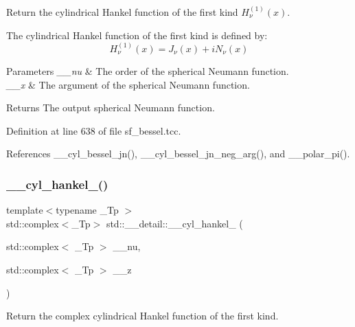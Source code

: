 Return the cylindrical Hankel function of the first kind $ H^{(1)}_\nu(x) $. 

The cylindrical Hankel function of the first kind is defined by\+: \[ H^{(1)}_\nu(x) = J_\nu(x) + i N_\nu(x) \]


\begin{DoxyParams}{Parameters}
{\em \+\_\+\+\_\+nu} & The order of the spherical Neumann function. \\
\hline
{\em \+\_\+\+\_\+x} & The argument of the spherical Neumann function. \\
\hline
\end{DoxyParams}
\begin{DoxyReturn}{Returns}
The output spherical Neumann function. 
\end{DoxyReturn}


Definition at line 638 of file sf\+\_\+bessel.\+tcc.



References \+\_\+\+\_\+cyl\+\_\+bessel\+\_\+jn(), \+\_\+\+\_\+cyl\+\_\+bessel\+\_\+jn\+\_\+neg\+\_\+arg(), and \+\_\+\+\_\+polar\+\_\+pi().

\mbox{\label{namespacestd_1_1____detail_a9904b6007ef78ef777ac8345f6e47960}} 
\subsubsection{\texorpdfstring{\+\_\+\+\_\+cyl\+\_\+hankel\+\_()}{\_\_cyl\_hankel\_1()}\hspace{0.1cm}{\footnotesize\ttfamily [2/2]}}
{\footnotesize\ttfamily template$<$typename \+\_\+\+Tp $>$ \\
std\+::complex$<$\+\_\+\+Tp$>$ std\+::\+\_\+\+\_\+detail\+::\+\_\+\+\_\+cyl\+\_\+hankel\+\_ (\begin{DoxyParamCaption}\item[{std\+::complex$<$ \+\_\+\+Tp $>$}]{\+\_\+\+\_\+nu,  }\item[{std\+::complex$<$ \+\_\+\+Tp $>$}]{\+\_\+\+\_\+z }\end{DoxyParamCaption})}



Return the complex cylindrical Hankel function of the first kind. 


